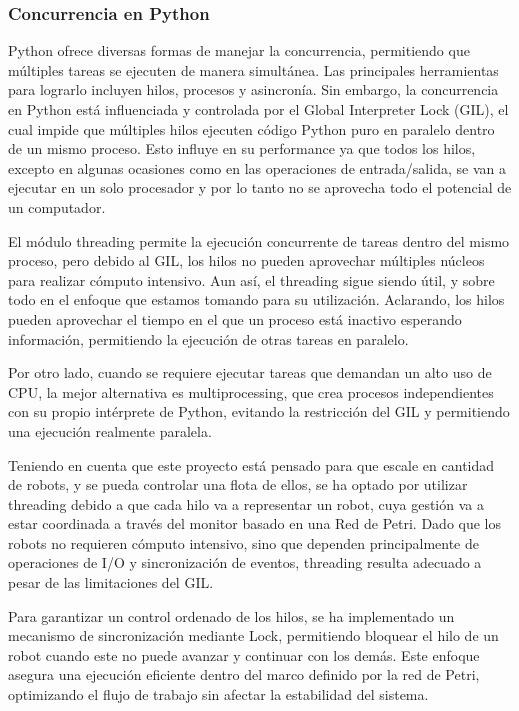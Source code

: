 \subsubsection{Concurrencia en Python} \mbox{} \vspace{5pt}

Python ofrece diversas formas de manejar la concurrencia, permitiendo que múltiples tareas se ejecuten de manera simultánea. Las principales herramientas para lograrlo incluyen hilos, procesos y asincronía. Sin embargo, la concurrencia en Python está influenciada y controlada por el Global Interpreter Lock (GIL), el cual impide que múltiples hilos ejecuten código Python puro en paralelo dentro de un mismo proceso. Esto influye en su performance ya que todos los hilos, excepto en algunas ocasiones como en las operaciones de entrada/salida, se van a ejecutar en un solo procesador y por lo tanto no se aprovecha todo el potencial de un computador.

El módulo threading permite la ejecución concurrente de tareas dentro del mismo proceso, pero debido al GIL, los hilos no pueden aprovechar múltiples núcleos para realizar cómputo intensivo. Aun así, el threading sigue siendo útil, y sobre todo en el enfoque que estamos tomando para su utilización. Aclarando, los hilos pueden aprovechar el tiempo en el que un proceso está inactivo esperando información, permitiendo la ejecución de otras tareas en paralelo.

Por otro lado, cuando se requiere ejecutar tareas que demandan un alto uso de CPU, la mejor alternativa es multiprocessing, que crea procesos independientes con su propio intérprete de Python, evitando la restricción del GIL y permitiendo una ejecución realmente paralela.

Teniendo en cuenta que este proyecto está pensado para que escale en cantidad de robots, y se pueda controlar una flota de ellos, se ha optado por utilizar threading debido a que cada hilo va a representar un robot, cuya gestión va a estar coordinada a través del monitor basado en una Red de Petri. Dado que los robots no requieren cómputo intensivo, sino que dependen principalmente de operaciones de I/O y sincronización de eventos, threading resulta adecuado a pesar de las limitaciones del GIL.

Para garantizar un control ordenado de los hilos, se ha implementado un mecanismo de sincronización mediante Lock, permitiendo bloquear el hilo de un robot cuando este no puede avanzar y continuar con los demás. Este enfoque asegura una ejecución eficiente dentro del marco definido por la red de Petri, optimizando el flujo de trabajo sin afectar la estabilidad del sistema.